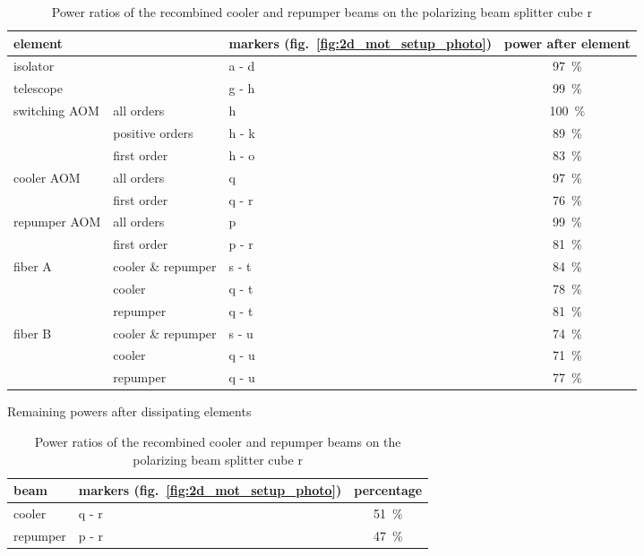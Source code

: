\begin{table}
    \centering
    \begin{subtable}{\textwidth}
        \centering
        \begin{tabular}{lllc}
            \toprule
            \multicolumn{2}{l}{\textbf{element}} & \textbf{markers} (fig.~\ref{fig:2d_mot_setup_photo}) & \textbf{power after element} \\
            \toprule
            isolator & & a - d & \SI{97}{\percent} \\
            \midrule
            telescope & & g - h & \SI{99}{\percent} \\
            \midrule
            \multirow{3}{*}{switching AOM} & all orders & h & \SI{100}{\percent} \\ 
            & positive orders & h - k & \SI{89}{\percent} \\
            & first order & h - o & \SI{83}{\percent} \\
            \midrule
            \multirow{2}{*}{cooler AOM} & all orders & q & \SI{97}{\percent} \\
            & first order  & q - r & \SI{76}{\percent} \\
            \midrule
            \multirow{2}{*}{repumper AOM} & all orders & p & \SI{99}{\percent} \\
            & first order  & p - r & \SI{81}{\percent} \\
            \midrule
            \multirow{3}{*}{fiber A} & cooler \& repumper & s - t & \SI{84}{\percent} \\
            & cooler & q - t & \SI{78}{\percent} \\
            & repumper & q - t & \SI{81}{\percent} \\
            \midrule
            \multirow{3}{*}{fiber B} & cooler \& repumper & s - u & \SI{74}{\percent} \\
            & cooler & q - u & \SI{71}{\percent} \\
            & repumper & q - u & \SI{77}{\percent} \\
            \bottomrule
        \end{tabular}
        \caption{Remaining powers after dissipating elements}    
        \label{tab:power_loss_table}
    \end{subtable}

    \vspace{1cm}
    \begin{subtable}{0.5\textwidth}
        \centering
        \begin{tabular}{llc}
            \toprule
            \textbf{beam} & \textbf{markers} (fig.~\ref{fig:2d_mot_setup_photo}) & \textbf{percentage} \\
            \toprule
            cooler & q - r & \SI{51}{\percent} \\
            repumper & p - r & \SI{47}{\percent} \\
            \bottomrule
        \end{tabular}
        \caption{Power ratios of the recombined cooler and repumper beams on the polarizing beam splitter cube r}
        \label{tab:power_recombination}
    \end{subtable}


\end{table}
